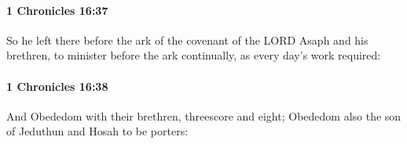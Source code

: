 		\paragraph{1 Chronicles 16:37} %
			\label{1CHRONICLES-16-37}

			So he left there before the ark of the covenant of the LORD Asaph and his brethren, to minister before the ark continually, as every day’s work required:


		\paragraph{1 Chronicles 16:38} %
			\label{1CHRONICLES-16-38}

			And Obededom with their brethren, threescore and eight; Obededom also the son of Jeduthun and Hosah to be porters:


